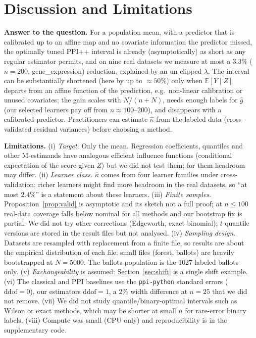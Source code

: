 \documentclass{article}
\newcommand{\E}{\mathbb{E}}
\begin{document}
\section{Discussion and Limitations}
\textbf{Answer to the question.} For a population mean, with a predictor that is calibrated up to an affine map and no covariate information the predictor missed, the optimally tuned PPI++ interval is already (asymptotically) as short as any regular estimator permits, and on nine real datasets we measure at most a $3.3\%$ ($n=200$, gene\_expression) reduction, explained by an un-clipped $\lambda$. The interval can be substantially shortened (here by up to $\approx50\%$) only when $\E[Y\mid Z]$ departs from an affine function of the prediction, e.g.\ non-linear calibration or unused covariates; the gain scales with $N/(n+N)$, needs enough labels for $\hat g$ (our selected learners pay off from $n\approx100$--$200$), and disappears with a calibrated predictor. Practitioners can estimate $\hat\kappa$ from the labeled data (cross-validated residual variances) before choosing a method.

\textbf{Limitations.} (i) \emph{Target.} Only the mean. Regression coefficients, quantiles and other M-estimands have analogous efficient influence functions (conditional expectation of the score given $Z$) but we did not test them; for them headroom may differ. (ii) \emph{Learner class.} $\hat\kappa$ comes from four learner families under cross-validation; richer learners might find more headroom in the real datasets, so ``at most $2.4\%$'' is a statement about these learners. (iii) \emph{Finite samples.} Proposition~\ref{prop:valid} is asymptotic and its sketch not a full proof; at $n\le100$ real-data coverage falls below nominal for all methods and our bootstrap fix is partial. We did not try other corrections (Edgeworth, exact binomial); $t$-quantile versions are stored in the result files but not analysed. (iv) \emph{Sampling design.} Datasets are resampled with replacement from a finite file, so results are about the empirical distribution of each file; small files (forest, ballots) are heavily bootstrapped at $N=5000$. The ballots population is the 1027 labeled ballots only. (v) \emph{Exchangeability} is assumed; Section~\ref{sec:shift} is a single shift example. (vi) The classical and PPI baselines use the \texttt{ppi-python} standard errors ($\mathrm{ddof}=0$), our estimators $\mathrm{ddof}=1$, a $2\%$ width difference at $n=25$ that we did not remove. (vii) We did not study quantile/binary-optimal intervals such as Wilson or exact methods, which may be shorter at small $n$ for rare-error binary labels. (viii) Compute was small (CPU only) and reproducibility is in the supplementary code.
\end{document}

